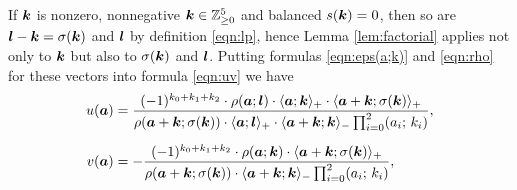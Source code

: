 \documentclass[a4paper,12pt]{article}
\theoremstyle{plain}
\def\Z{\mathbb{Z}}
\def\ba{\mbox{\boldmath $a$}}
\def\bk{\mbox{\boldmath $k$}}
\def\bl{\mbox{\boldmath $l$}}
\begin{document}
\par
If $\bk$ is nonzero, nonnegative $\bk \in \Z_{\ge0}^5$ and balanced $s(\bk) = 0$, 
then so are $\bl-\bk = \sigma(\bk)$ and $\bl$ by definition \eqref{eqn:lp}, hence 
Lemma \ref{lem:factorial} applies not only to $\bk$ but also to $\sigma(\bk)$ 
and $\bl$.    
Putting formulas \eqref{eqn:eps(a;k)} and \eqref{eqn:rho} for these vectors 
into formula \eqref{eqn:uv} we have  
\begin{subequations} \label{eqn:uv2}
\begin{align}
u(\ba) &= \dfrac{(-1)^{k_0+k_1+k_2} \cdot \rho(\ba; \bl) \cdot 
\langle \ba; \bk\rangle_+ \cdot 
\langle \ba+\bk; \sigma(\bk) \rangle_+ }{ \rho(\ba+\bk; \sigma(\bk)) \cdot 
\langle \ba; \bl \rangle_+ \cdot \langle \ba+\bk; \bk \rangle_-  
\prod_{i=0}^2 (a_i; \, k_i)  },  
\label{eqn:uv2u} \\[2mm]
v(\ba) &= - \dfrac{(-1)^{k_0+k_1+k_2} \cdot \rho(\ba; \bk) \cdot  
\langle \ba+\bk; \sigma(\bk) \rangle_+ }{ \rho(\ba+\bk; \sigma(\bk)) \cdot 
\langle \ba+\bk; \bk \rangle_- \prod_{i=0}^2 (a_i; \, k_i)  },  
\label{eqn:uv2v} 
\end{align}
\end{subequations}
\end{document}
